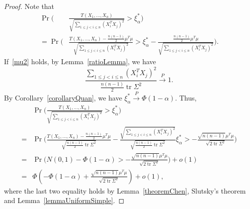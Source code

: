 \documentclass[review]{elsarticle}
\DeclareMathOperator{\mytr}{tr}
\theoremstyle{plain}
\theoremstyle{definition}
\theoremstyle{remark}
\begin{document}
\begin{proof} 
    Note that
    \begin{align}
        \Pr\Big(&\frac{T( X_1,\ldots, X_n)}{\sqrt{\sum_{1\leq j<i\leq n}{(X_i^T X_j)}^2}}>\xi_{\alpha}^* \Big)\nonumber\\
            =
            \Pr\bigg(&\frac{T( X_1,\ldots, X_n)-\frac{n(n-1)}{2}\mu^T\mu}{\sqrt{\sum_{1\leq j<i\leq n}{(X_i^T X_j)}^2}}>\xi_{\alpha}^*\nonumber
            -\frac{\frac{n(n-1)}{2}\mu^T\mu}{\sqrt{\sum_{1\leq j<i\leq n}{(X_i^T X_j)}^2}} \bigg).\nonumber
    \end{align}
    If~\eqref{mu2} holds, by Lemma~\ref{ratioLemma}, we have
    \begin{equation*}
    \frac{\sum_{1\leq j< i\leq n}(X_i^T X_j)^2}{\frac{n(n-1)}{2}\mytr \Sigma^2}\xrightarrow{P}1.
    \end{equation*}
    By Corollary~\ref{corollaryQuan}, we have $\xi_{\alpha}^*\xrightarrow{P} \Phi(1-\alpha)$.
Thus,
    \begin{equation*}
        \begin{aligned}
            &\Pr\Big(\frac{T( X_1,\ldots, X_n)}{\sqrt{\sum_{1\leq j<i\leq n}{(X_i^T X_j)}^2}}>\xi_{\alpha}^* \Big)\\
            =&
            \Pr\Big(\frac{T( X_1,\ldots, X_n)-\frac{n(n-1)}{2}\mu^T\mu}{\sqrt{\frac{n(n-1)}{2}\mytr \Sigma^2}}
            -
            \frac{\sqrt{\sum_{1\leq j<i\leq n}{(X_i^T X_j)}^2}}{\sqrt{\frac{n(n-1)}{2}\mytr \Sigma^2}}\xi_{\alpha}^*>
            -\frac{\sqrt{n(n-1)}\mu^T\mu}{\sqrt{2\mytr \Sigma^2}} \Big)\\
            =&
            \Pr\Big(N(0,1)-\Phi(1-\alpha)>-\frac{\sqrt{n(n-1)}\mu^T\mu}{\sqrt{2\mytr \Sigma^2}}\Big)+o(1)\\
            =&
            \Phi(-\Phi(1-\alpha)+\frac{\sqrt{n(n-1)}\mu^T\mu}{\sqrt{2\mytr \Sigma^2}})+o(1),
        \end{aligned}
    \end{equation*}
    where the last two equality holds by Lemma~\ref{theoremChen}, Slutsky's theorem and Lemma~\ref{lemmaUniformSimple}.


\end{proof}
\end{document}
